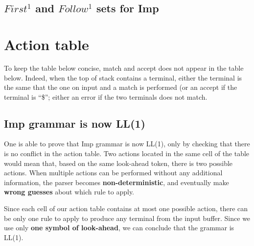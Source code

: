 \subsection{$First^1$ and $Follow^1$ sets for Imp}

    {\small\ttfamily
      
    }


\section{Action table}

To keep the table below concise, match and accept does not appear in the table below. Indeed, when the top of stack
contains a terminal, either the terminal is the same that the one on input and a match is performed (or an accept if the
terminal is ``\$''; either an error if the two terminals does not match.

{\small\ttfamily
  
}


\subsection{Imp grammar is now LL(1)}

One is able to prove that Imp grammar is now LL(1), only by checking that there is no conflict in the action table.
Two actions located in the same cell of the table would mean that, based on the same look-ahead token, 
there is two possible actions. When multiple actions can be performed without any additional information,
the parser becomes \textbf{non-deterministic}, and eventually make \textbf{wrong guesses} about which rule to apply.

Since each cell of our action table contains at most one possible action, there can be only one rule to apply to produce
any terminal from the input buffer. Since we use only \textbf{one symbol of look-ahead}, we can conclude
that the grammar is LL(1).

